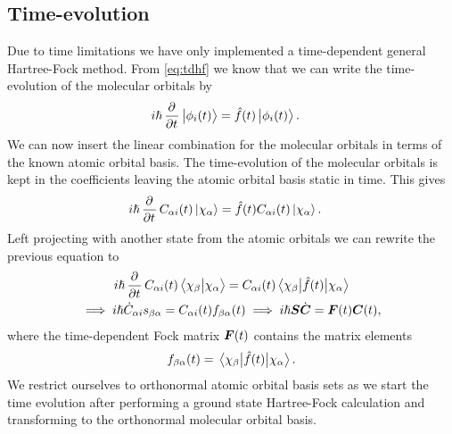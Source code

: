         \subsection{Time-evolution}
            Due to time limitations we have only implemented a time-dependent
            general Hartree-Fock method.
            From \autoref{eq:tdhf} we know that we can write the time-evolution
            of the molecular orbitals by
            \begin{align}
                i\hslash\dpd{}{t}\ket{\phi_i(t)}
                &= \fock(t)\ket{\phi_i(t)}.
            \end{align}
            We can now insert the linear combination for the molecular orbitals in
            terms of the known atomic orbital basis.
            The time-evolution of the molecular orbitals is kept in the
            coefficients leaving the atomic orbital basis static in time.
            This gives
            \begin{align}
                i\hslash\dpd{}{t}C_{\alpha i}(t)\ket{\chi_{\alpha}}
                &= \fock(t)C_{\alpha i}(t)\ket{\chi_{\alpha}}.
            \end{align}
            Left projecting with another state from the atomic orbitals we can rewrite
            the previous equation to
            \begin{gather}
                i\hslash\dpd{}{t}C_{\alpha i}(t)\braket{\chi_{\beta}}{\chi_{\alpha}}
                =
                C_{\alpha i}(t)\mel{\chi_{\beta}}{\fock(t)}{\chi_{\alpha}}
                \\
                \implies
                i\hslash \dot{C}_{\alpha i} \overlapten_{\beta\alpha}
                = C_{\alpha i}(t)\fockten_{\beta\alpha}(t)
                \implies
                i\hslash \vf{S}\dot{\vf{C}}
                = \fockmat(t)\vf{C}(t),
                \label{eq:tdhf-equations}
            \end{gather}
            where the time-dependent Fock matrix $\boldsymbol{F}(t)$ contains the
            matrix elements
            \begin{align}
                f_{\beta\alpha}(t)
                = \mel{\chi_{\beta}}{\hat{f}(t)}{\chi_\alpha}.
            \end{align}
            We restrict ourselves to orthonormal atomic orbital basis sets as we
            start the time evolution after performing a ground state
            Hartree-Fock calculation and transforming to the orthonormal
            molecular orbital basis.
